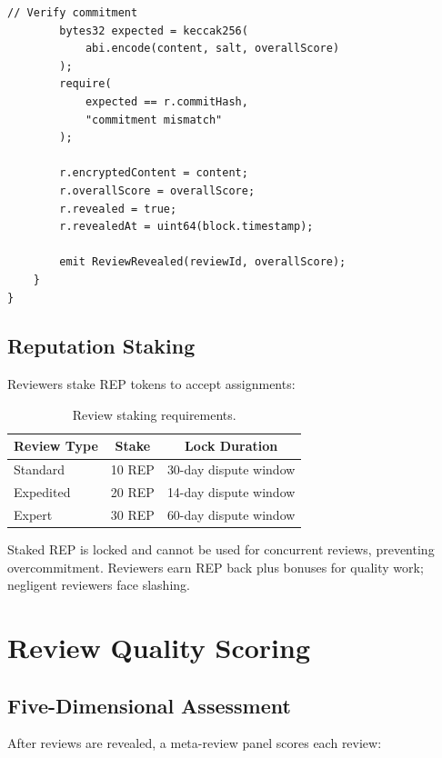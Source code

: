 \documentclass[11pt,letterpaper]{article}
\begin{document}
\begin{lstlisting}[language=Solidity,caption=Review submission with ZK proof]
        // Verify commitment
        bytes32 expected = keccak256(
            abi.encode(content, salt, overallScore)
        );
        require(
            expected == r.commitHash,
            "commitment mismatch"
        );

        r.encryptedContent = content;
        r.overallScore = overallScore;
        r.revealed = true;
        r.revealedAt = uint64(block.timestamp);

        emit ReviewRevealed(reviewId, overallScore);
    }
}
\end{lstlisting}

\subsection{Reputation Staking}

Reviewers stake REP tokens to accept assignments:

\begin{table}[h]
\centering
\caption{Review staking requirements.}
\label{tab:staking}
\begin{tabular}{lcc}
\toprule
\textbf{Review Type} & \textbf{Stake} & \textbf{Lock Duration} \\
\midrule
Standard & 10 REP & 30-day dispute window \\
Expedited & 20 REP & 14-day dispute window \\
Expert & 30 REP & 60-day dispute window \\
\bottomrule
\end{tabular}
\end{table}

Staked REP is locked and cannot be used for concurrent reviews, preventing overcommitment. Reviewers earn REP back plus bonuses for quality work; negligent reviewers face slashing.

\section{Review Quality Scoring}
\label{sec:quality}

\subsection{Five-Dimensional Assessment}

After reviews are revealed, a meta-review panel scores each review:
\end{document}
